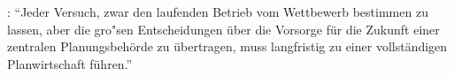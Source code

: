 \documentclass[
    onecolumn,
    a4paper,
    abstracton,
    parskip=half
    ,final
    ]{scrartcl}
\begin{document}



 \citep[vgl.][S.23f]{Hayek1969}: "`Jeder Versuch, zwar den laufenden Betrieb vom Wettbewerb bestimmen zu lassen,
 aber die gro{"s}en Entscheidungen {\"u}ber die Vorsorge f{\"u}r die Zukunft einer zentralen Planungsbeh{\"o}rde zu {\"u}bertragen,
muss langfristig zu einer vollst{\"a}ndigen Planwirtschaft f{\"u}hren."'
\end{document}

